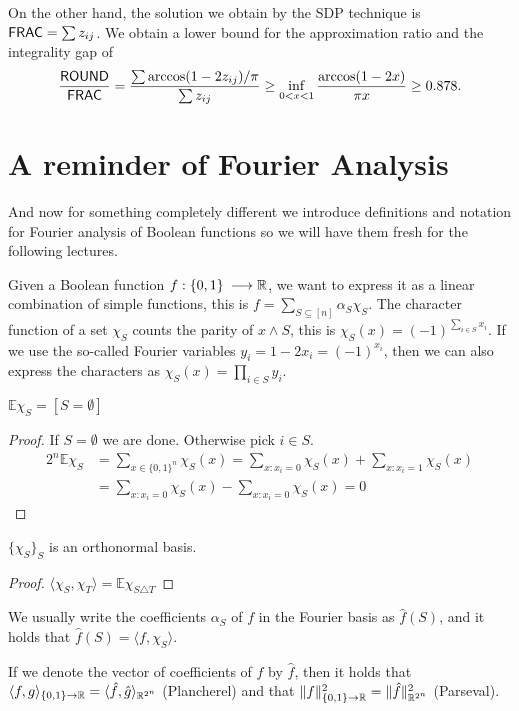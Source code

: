 \documentclass[a4paper,twoside,justified]{tufte-handout}
\begin{document}
On the other hand, the solution we obtain by the SDP technique is $\mathsf{FRAC} = \sum z_{ij}$. We obtain a lower bound for the approximation ratio and the integrality gap of \begin{equation}\frac{\mathsf{ROUND}}{\mathsf{FRAC}} = \frac{\sum \arccos(1-2z_{ij})/\pi}{\sum z_{ij}} \geq \inf_{0 < x < 1} \frac{\arccos(1-2x)}{\pi x} \geq 0.878.\end{equation}


\section{A reminder of Fourier Analysis}

And now for something completely different we introduce definitions and notation for Fourier analysis of Boolean functions so we will have them fresh for the following lectures.

Given a Boolean function $f:\{0,1\}\:\longrightarrow \mathbb{R}$, we want to express it as a linear combination of simple functions, this is $f = \sum_{S \subseteq [n]} \alpha_S \chi_S$. The character function of a set $\chi_S$ counts the parity of $x \land S$, this is $\chi_S(x) = (-1)^{\sum_{i\in S} x_i}$. If we use the so-called Fourier variables $y_i = 1-2x_i = (-1)^{x_i}$, then we can also express the characters as $\chi_S(x) = \prod_{i\in S} y_i$.

\begin{lemma}
  $\mathbb{E} \chi_S = [S=\emptyset]$
\end{lemma}
\begin{proof}
  If $S=\emptyset$ we are done. Otherwise pick $i\in S$.
\begin{align}
2^n \mathbb{E} \chi_S &=
\sum_{x \in \{0,1\}^n} \chi_S(x) = 
\sum_{x : x_i = 0} \chi_S(x) + \sum_{x : x_i = 1} \chi_S(x) \\ &= 
\sum_{x : x_i = 0} \chi_S(x) - \sum_{x : x_i = 0} \chi_S(x) = 0
\end{align}
\end{proof}

\begin{lemma}
  $\{\chi_S\}_S$ is an orthonormal basis.
\end{lemma}
\begin{proof}
  $\langle \chi_S, \chi_T \rangle = \mathbb{E}\chi_{S \triangle T}$
\end{proof}

We usually write the coefficients $\alpha_S$ of $f$ in the Fourier basis as $\hat{f}(S)$, and it holds that $\hat{f}(S) = \langle f,\chi_S \rangle$.

If we denote the vector of coefficients of $f$ by $\hat f$, then it holds that $\langle f,g \rangle_{\{0,1\}\to\mathbb{R}} = \langle \hat f, \hat g \rangle_{\mathbb{R}^{2^n}}$ (Plancherel) and that $\|f\|_{\{0,1\}\to\mathbb{R}}^2=\|\hat f\|_{\mathbb{R}^{2^n}}^2$ (Parseval).



\end{document}
